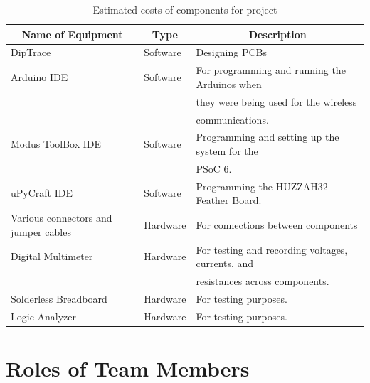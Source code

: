 \begin{table} [H]
	\normalsize
	\centering
	\begin{tabular}{|l|l|l|}
		\hline
		\multicolumn{1}{|c|}{\textbf{Name of Equipment}}  & 
		\multicolumn{1}{|c|}{\textbf{Type}}  & 
		\multicolumn{1}{|c|}{\textbf{Description}} \\
		\hline
				DipTrace 	&  Software		& Designing PCBs \\
		\hline
				Arduino IDE 	&  Software		& For programming and running the Arduinos when \\
								&  				& they were being used for the wireless \\
								&  				& communications. \\
		\hline
				Modus ToolBox IDE 	&  Software		& Programming and setting up the system for the \\
									&  				& PSoC 6. \\
		\hline
				uPyCraft IDE 	&  Software		& Programming the HUZZAH32 Feather Board. \\
		\hline
				Various connectors and jumper cables	&  Hardware		& For connections between components  \\
		\hline
				Digital Multimeter 	&  Hardware		& For testing and recording voltages, currents, and \\
									&  				& resistances across components. \\
		\hline
				Solderless Breadboard 	&  Hardware		& For testing purposes. \\
		\hline
				Logic Analyzer 	&  Hardware		& For testing purposes. \\

		\hline 
	\end{tabular} 
	\caption{Estimated costs of components for project}
	\label{table:1}
\end{table}	

\section{Roles of Team Members}
